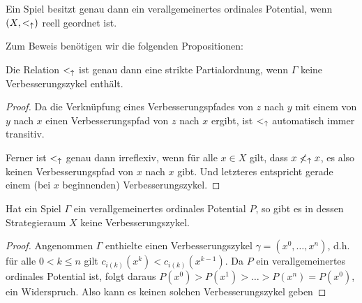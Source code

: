 \begin{satz}\label{satz:CharVerallOrdPot}
	Ein Spiel besitzt genau dann ein verallgemeinertes ordinales Potential, wenn $(X, <_\uparrow)$ reell geordnet ist.
\end{satz}

Zum Beweis benötigen wir die folgenden Propositionen:
\begin{prop}\label{prop:VerRelPartOrdVerbz}
	Die Relation $<_\uparrow$ ist genau dann eine strikte Partialordnung, wenn $\Gamma$ keine Verbesserungszykel enthält.
\end{prop}

\begin{proof}
	Da die Verknüpfung eines Verbesserungspfades von $z$ nach $y$ mit einem von $y$ nach $x$ einen Verbesserungspfad von $z$ nach $x$ ergibt, ist $<_\uparrow$ automatisch immer transitiv.
	
	Ferner ist $<_\uparrow$ genau dann irreflexiv, wenn für alle $x \in X$ gilt, dass $x \not<_\uparrow x$, es also keinen Verbesserungspfad von $x$ nach $x$ gibt. Und letzteres entspricht gerade einem (bei $x$ beginnenden) Verbesserungszykel.
\end{proof}

\begin{prop}\label{prop:VerOrdPotKeineVBZ}
	Hat ein Spiel $\Gamma$ ein verallgemeinertes ordinales Potential $P$, so gibt es in dessen Strategieraum $X$ keine Verbesserungszykel.
\end{prop}

\begin{proof}
	Angenommen $\Gamma$ enthielte einen Verbesserungszykel $\gamma = (x^0, \dots, x^n)$, d.h. für alle $0 < k \leq n$ gilt $c_{i(k)}(x^k) < c_{i(k)}(x^{k-1})$. Da $P$ ein verallgemeinertes ordinales Potential ist, folgt daraus $P(x^0) > P(x^1) > \dots > P(x^n) = P(x^0)$, ein Widerspruch. Also kann es keinen solchen Verbesserungszykel geben
\end{proof}


